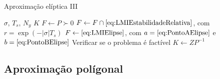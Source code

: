 \documentclass[aspectratio=169,11pt,t,xcolor={usenames,dvipsnames,x11names}]{beamer}
\begin{document}
\begin{frame}[c]{Aproximação elíptica III}
	  \begin{algorithmic}[1]
	    \Require $\sigma$, $T_s$, $N_y$
	    \Ensure $K$
	    \State $F \gets P \succ 0$
	    \State $F \gets F \cap \eqref{eq:LMIEstabilidadeRelativa}$, com $r = \exp{\left(-|\sigma|T_s\right)}$ 
	    \State $F \gets \eqref{eq:LMIElipse}$, com $a = \eqref{eq:PontoAElipse}$ e $b = \eqref{eq:PontoBElipse}$ 
	    \State Verificar se o problema é factível
	    \State $K \gets ZP^{-1}$
	  \end{algorithmic}
\end{frame}

\subsection{Aproximação polígonal}
\end{document}
